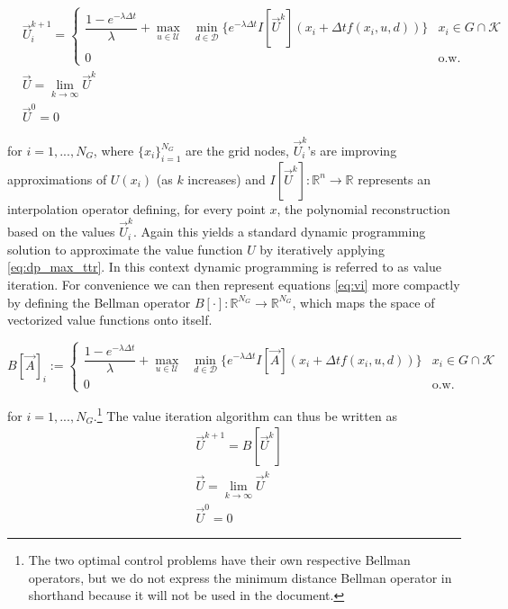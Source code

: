 \documentclass{journal}
\newcommand{\D}{\mathcal{D}}
\newcommand{\K}{\mathcal{K}}
\newcommand{\U}{\mathcal{U}}
\newcommand{\RR}{\mathbb{R}}
\newcommand{\optud}{\underset{u\in\U}{\max}\text{ }\underset{ d\in\D}{\min}}
\begin{document}
\begin{subequations} \label{eq:vi}
\begin{align}
&\vec{U}_{i}^{k+1} = 
  \begin{cases}  \label{eq:dp_max_ttr}
    \dfrac{1-e^{-\lambda \Delta t}}{\lambda}+\optud \{e^{-\lambda \Delta t} I[\vec{U}^{k}](x_i+\Delta t f(x_i,u,d))\} & x_i \in G\cap\K \\
    0 & \text{o.w.}
  \end{cases}\\
&\vec{U} = \lim_{k\rightarrow \infty} \vec{U}^{k}\\
&\vec{U}^{0} = 0
\end{align}
\end{subequations}

\noindent for $i=1, ..., N_G$, where $\{x_i\}_{i=1}^{N_G}$ are the grid nodes, $\vec{U}_i^k$'s are improving approximations of $U(x_i)$ (as $k$ increases) and $I[\vec{U}^k]:\RR^n \rightarrow \RR$ represents an interpolation operator defining, for every point $x$, the polynomial reconstruction based on the values $\vec{U}_i^k$. Again this yields a standard dynamic programming solution to approximate the value function $U$ by iteratively applying \ref{eq:dp_max_ttr}. In this context dynamic programming is referred to as value iteration. For convenience we can then represent equations \ref{eq:vi} more compactly by defining the Bellman operator $B[\cdot]: \RR^{N_G} \rightarrow \RR^{N_G}$, which maps the space of vectorized value functions onto itself.

\begin{equation} \label{eq:bell}
 B[\vec{A}]_i :=
  \begin{cases}
    \dfrac{1-e^{-\lambda \Delta t}}{\lambda}+\optud \{e^{-\lambda \Delta t} I[\vec{A}](x_i+\Delta t f(x_i,u,d))\} & x_i \in G\cap\K \\
    0 & \text{o.w.}
   \end{cases}
\end{equation}

\noindent for $i=1, ..., N_G$.\footnote{The two optimal control problems have their own respective Bellman operators, but we do not express the minimum distance Bellman operator in shorthand because it will not be used in the document.} The value iteration algorithm can thus be written as
\begin{subequations} \label{eq:vi}
\begin{align}
&\vec{U}^{k+1} = B[\vec{U}^{k}]\\
&\vec{U} = \lim_{k\rightarrow \infty} \vec{U}^{k}\\
&\vec{U}^{0} = 0
\end{align}
\end{subequations}
\end{document}

